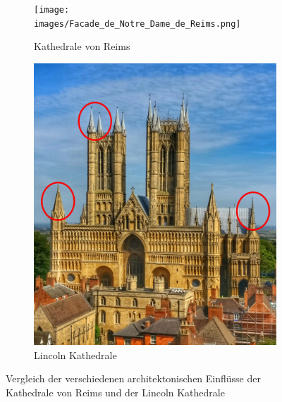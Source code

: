 \documentclass[a4paper, ngerman, 12pt, usenames, dvipsnames]{article}
\begin{document}
\begin{figure}[h]
    \centering
    \begin{subfigure}{.43\textwidth}
        \centering
        \texttt{[image: images/Facade\_de\_Notre\_Dame\_de\_Reims.png]}
        \caption{Kathedrale von Reims \footnotemark}
    \end{subfigure}%
    \begin{subfigure}{.57\textwidth}
        \centering
        \includegraphics[width=.9\linewidth]{images/LincolnCathedral.jpg}
        \caption{Lincoln Kathedrale \footnotemark}
    \end{subfigure}
    \caption{Vergleich der verschiedenen architektonischen Einflüsse der Kathedrale von Reims und der Lincoln Kathedrale}
\end{figure}
\end{document}
